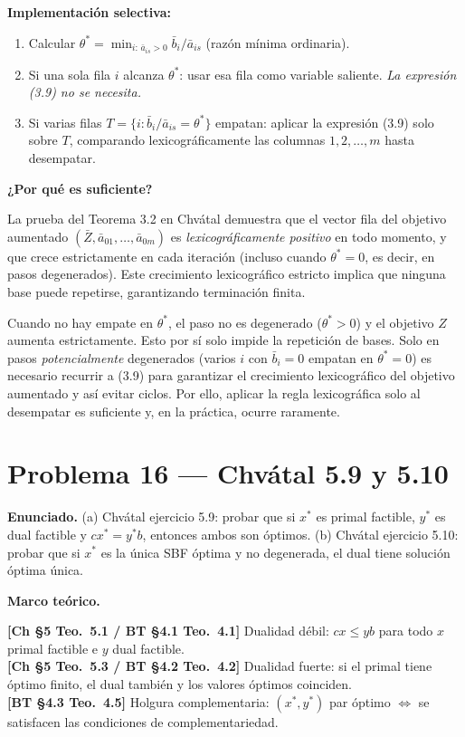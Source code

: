\documentclass{article}
\newenvironment{marco}{\begin{mdframed}[linecolor=black!40,backgroundcolor=gray!5]\small\textbf{Marco teórico.}\par\smallskip}{\end{mdframed}\medskip}
\begin{document}
\textbf{Implementación selectiva:}

\begin{enumerate}[(1)]
  \item Calcular $\theta^* = \min_{i:\,\bar{a}_{is}>0} \bar{b}_i / \bar{a}_{is}$ (razón mínima ordinaria).
  \item Si una sola fila $i$ alcanza $\theta^*$: usar esa fila como variable saliente. \emph{La expresión (3.9) no se necesita.}
  \item Si varias filas $T = \{i : \bar{b}_i/\bar{a}_{is} = \theta^*\}$ empatan: aplicar la expresión (3.9) solo sobre $T$, comparando lexicográficamente las columnas $1, 2, \ldots, m$ hasta desempatar.
\end{enumerate}

\textbf{¿Por qué es suficiente?}

La prueba del Teorema 3.2 en Chvátal demuestra que el vector fila del objetivo aumentado $(\bar{Z}, \bar{a}_{01}, \ldots, \bar{a}_{0m})$ es \emph{lexicográficamente positivo} en todo momento, y que crece estrictamente en cada iteración (incluso cuando $\theta^* = 0$, es decir, en pasos degenerados). Este crecimiento lexicográfico estricto implica que ninguna base puede repetirse, garantizando terminación finita.

Cuando no hay empate en $\theta^*$, el paso no es degenerado ($\theta^* > 0$) y el objetivo $Z$ aumenta estrictamente. Esto por sí solo impide la repetición de bases. Solo en pasos \emph{potencialmente} degenerados (varios $i$ con $\bar{b}_i = 0$ empatan en $\theta^* = 0$) es necesario recurrir a (3.9) para garantizar el crecimiento lexicográfico del objetivo aumentado y así evitar ciclos. Por ello, aplicar la regla lexicográfica solo al desempatar es suficiente y, en la práctica, ocurre raramente.

\section*{Problema 16 --- Chvátal 5.9 y 5.10}

\textbf{Enunciado.} (a) Chvátal ejercicio 5.9: probar que si $x^*$ es primal factible, $y^*$ es dual factible y $cx^* = y^*b$, entonces ambos son óptimos. (b) Chvátal ejercicio 5.10: probar que si $x^*$ es la única SBF óptima y no degenerada, el dual tiene solución óptima única.

\begin{marco}
\textbf{[Ch §5 Teo.\ 5.1 / BT §4.1 Teo.\ 4.1]} Dualidad débil: $cx \leq yb$ para todo $x$ primal factible e $y$ dual factible. \\[2pt]
\textbf{[Ch §5 Teo.\ 5.3 / BT §4.2 Teo.\ 4.2]} Dualidad fuerte: si el primal tiene óptimo finito, el dual también y los valores óptimos coinciden. \\[2pt]
\textbf{[BT §4.3 Teo.\ 4.5]} Holgura complementaria: $(x^*, y^*)$ par óptimo $\Leftrightarrow$ se satisfacen las condiciones de complementariedad.
\end{marco}
\end{document}
